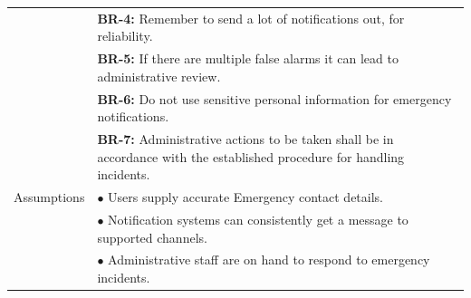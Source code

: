 \begin{longtable}{|>{\raggedright\arraybackslash}p{4cm}|>{\raggedright\arraybackslash}p{11cm}|}
& \textbf{BR-4:} Remember to send a lot of notifications out, for reliability. \\
& \textbf{BR-5:} If there are multiple false alarms it can lead to administrative review. \\
& \textbf{BR-6:} Do not use sensitive personal information for emergency notifications. \\
& \textbf{BR-7:} Administrative actions to be taken shall be in accordance with the established procedure for handling incidents. \\
\hline
Assumptions & $\bullet$ Users supply accurate Emergency contact details. \\
& $\bullet$ Notification systems can consistently get a message to supported channels. \\
& $\bullet$ Administrative staff are on hand to respond to emergency incidents. \\
\hline

\end{longtable}

